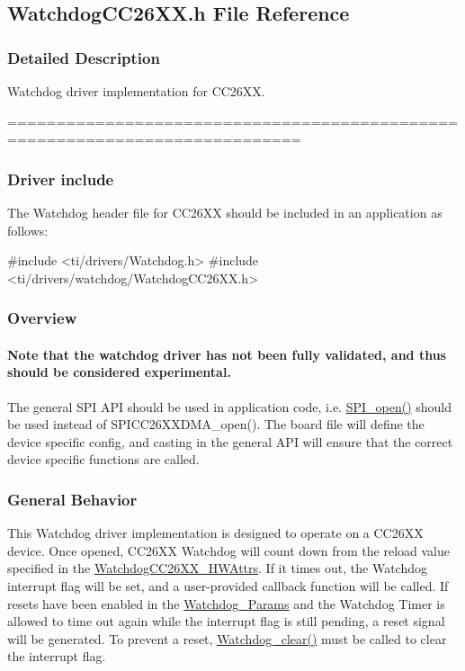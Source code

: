 \subsection{Watchdog\+C\+C26\+X\+X.\+h File Reference}
\label{_watchdog_c_c26_x_x_8h}


\subsubsection{Detailed Description}
Watchdog driver implementation for C\+C26\+X\+X. 

============================================================================

\subsubsection*{Driver include}

The Watchdog header file for C\+C26\+X\+X should be included in an application as follows\+: 
\begin{DoxyCode}
\textcolor{preprocessor}{#include <ti/drivers/Watchdog.h>}
\textcolor{preprocessor}{#include <ti/drivers/watchdog/WatchdogCC26XX.h>}
\end{DoxyCode}


\subsubsection*{Overview}

\paragraph*{Note that the watchdog driver has not been fully validated, and thus should be considered experimental.}

The general S\+P\+I A\+P\+I should be used in application code, i.\+e. \hyperlink{_s_p_i_8h_a62cfe494cb1df47cd602e8747e894fd1}{S\+P\+I\+\_\+open()} should be used instead of S\+P\+I\+C\+C26\+X\+X\+D\+M\+A\+\_\+open(). The board file will define the device specific config, and casting in the general A\+P\+I will ensure that the correct device specific functions are called.

\subsubsection*{General Behavior}

This Watchdog driver implementation is designed to operate on a C\+C26\+X\+X device. Once opened, C\+C26\+X\+X Watchdog will count down from the reload value specified in the \hyperlink{struct_watchdog_c_c26_x_x___h_w_attrs}{Watchdog\+C\+C26\+X\+X\+\_\+\+H\+W\+Attrs}. If it times out, the Watchdog interrupt flag will be set, and a user-\/provided callback function will be called. If resets have been enabled in the \hyperlink{struct_watchdog___params}{Watchdog\+\_\+\+Params} and the Watchdog Timer is allowed to time out again while the interrupt flag is still pending, a reset signal will be generated. To prevent a reset, \hyperlink{_watchdog_8h_a396decd6b1807db10c636f9987c3be4c}{Watchdog\+\_\+clear()} must be called to clear the interrupt flag.

